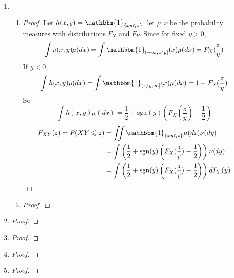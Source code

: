 \documentclass{article}
\begin{document}
\begin{enumerate}
        \item \begin{enumerate}
            \item \begin{proof} 
                Let $h(x,y)=\mathbbm{1}_{\{xy\leqslant z\}}$, let $\mu,\nu$ be the probability measures with distributions $F_X$ and $F_Y$. Since for fixed $y>0$,
                $$\int{h(x,y)\mu(dx)}=\int{\mathbbm{1}_{(-\infty,z/y]}(x)\mu(dx)}=F_X(\frac{z}{y})$$
                If $y<0$,
                $$\int{h(x,y)\mu(dx)}=\int{\mathbbm{1}_{(z/y,\infty]}(x)\mu(dx)}=1-F_X(\frac{z}{y})$$
                So $$\int{h(x,y)\mu(dx)}=\frac{1}{2}+\text{sgn}{(y)}\left(F_X(\frac{z}{y})-\frac{1}{2}\right)$$
                \begin{align*}
                    F_{XY}(z)=P(XY\leqslant z)&=\iint{\mathbbm{1}_{\{xy\leqslant z\}}\mu(dx)\nu(dy)}\\
                    &=\int \left(\frac{1}{2}+\text{sgn}{(y)}\left(F_X(\frac{z}{y})-\frac{1}{2}\right)\right)\nu(dy)\\
                    &=\int \left(\frac{1}{2}+\text{sgn}{(y)}\left(F_X(\frac{z}{y})-\frac{1}{2}\right)\right)dF_Y(y)
                \end{align*}
            \end{proof}
            \item \begin{proof}
                
            \end{proof}
            \end{enumerate}


        \item \begin{proof}
            
        \end{proof}

        

        \item \begin{proof}
            
        \end{proof}


        \item \begin{proof}

        \end{proof}


        \item \begin{proof}
            
        \end{proof}
    
    \end{enumerate}
\end{document}
